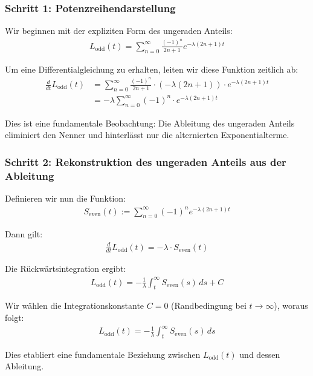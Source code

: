 \documentclass[a4paper,12pt,twoside]{report}
\theoremstyle{definition}
\begin{document}
\subsubsection*{Schritt 1: Potenzreihendarstellung}

Wir beginnen mit der expliziten Form des ungeraden Anteils:
\begin{align}
	L_{\text{odd}}(t) = \sum_{n=0}^{\infty} \frac{(-1)^n}{2n+1} e^{-\lambda(2n+1)t}
\end{align}

Um eine Differentialgleichung zu erhalten, leiten wir diese Funktion zeitlich ab:
\begin{align}
	\frac{d}{dt} L_{\text{odd}}(t) &= \sum_{n=0}^{\infty} \frac{(-1)^n}{2n+1} \cdot (-\lambda(2n+1)) \cdot e^{-\lambda(2n+1)t} \\
	&= -\lambda \sum_{n=0}^{\infty} (-1)^n \cdot e^{-\lambda(2n+1)t}
\end{align}

Dies ist eine fundamentale Beobachtung: Die Ableitung des ungeraden Anteils eliminiert den Nenner und hinterlässt nur die alternierten Exponentialterme.

\subsubsection*{Schritt 2: Rekonstruktion des ungeraden Anteils aus der Ableitung}

Definieren wir nun die Funktion:
\begin{align}
	S_{\text{even}}(t) := \sum_{n=0}^{\infty} (-1)^n e^{-\lambda(2n+1)t}
\end{align}

Dann gilt:
\begin{align}
	\frac{d}{dt} L_{\text{odd}}(t) = -\lambda \cdot S_{\text{even}}(t)
\end{align}

Die Rückwärtsintegration ergibt:
\begin{align}
	L_{\text{odd}}(t) = -\frac{1}{\lambda} \int_t^{\infty} S_{\text{even}}(s) \, ds + C
\end{align}

Wir wählen die Integrationskonstante $C = 0$ (Randbedingung bei $t \to \infty$), woraus folgt:
\begin{align}
	L_{\text{odd}}(t) = -\frac{1}{\lambda} \int_t^{\infty} S_{\text{even}}(s) \, ds
\end{align}

Dies etabliert eine fundamentale Beziehung zwischen $L_{\text{odd}}(t)$ und dessen Ableitung.
\end{document}
